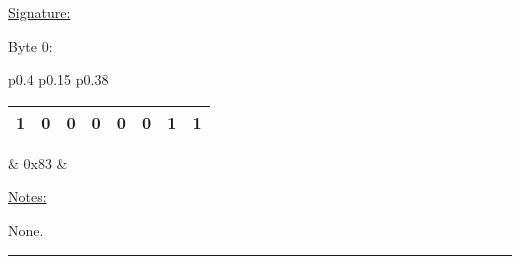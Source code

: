 \underline{Signature:}

Byte 0:

\begin{tabular}{p{0.4\linewidth} p{0.15\linewidth} p{0.38\linewidth}} 

\begin{tabular}{|p{0.3cm}|p{0.3cm}|p{0.3cm}|p{0.3cm}|p{0.3cm}|p{0.3cm}|p{0.3cm}|p{0.3cm}|}
\hline
1 & 0 & 0 & 0 & 0 & 0 & 1 & 1\\
\hline
\end{tabular}
& 0x83 & \\
\end{tabular}

\underline{Notes:} 

None.

\rule{15.1cm}{0.4pt}

